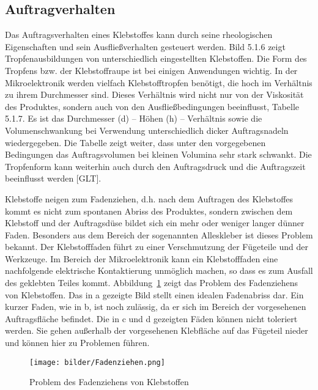 \subsection{Auftragverhalten}
Das Auftragsverhalten eines Klebstoffes kann durch seine rheologischen Eigenschaften und sein Ausfließverhalten gesteuert werden. Bild 5.1.6 zeigt Tropfenausbildungen von unterschiedlich eingestellten Klebstoffen. Die Form des Tropfens bzw. der Klebstoffraupe ist bei einigen Anwendungen wichtig. In der Mikroelektronik werden vielfach Klebstofftropfen benötigt, die hoch im Verhältnis zu ihrem Durchmesser sind. Dieses Verhältnis wird nicht nur von der Viskosität des Produktes, sondern auch von den
Ausfließbedingungen beeinflusst, Tabelle 5.1.7. Es ist das Durchmesser (d) – Höhen (h) – Verhältnis sowie die Volumenschwankung bei Verwendung unterschiedlich dicker Auftragsnadeln wiedergegeben. Die Tabelle zeigt weiter, dass unter den vorgegebenen Bedingungen das Auftragsvolumen bei kleinen Volumina sehr stark schwankt. Die Tropfenform kann weiterhin auch durch den Auftragsdruck und die Auftragszeit beeinflusst werden [GLT].

Klebstoffe neigen zum Fadenziehen, d.h. nach dem Auftragen des Klebstoffes kommt es nicht zum spontanen Abriss des Produktes, sondern zwischen dem Klebstoff und der Auftragsdüse bildet sich ein mehr oder weniger langer dünner Faden. Besonders aus dem Bereich der sogenannten Alleskleber ist dieses Problem bekannt. Der Klebstofffaden führt zu einer Verschmutzung der Fügeteile und der Werkzeuge. Im Bereich der Mikroelektronik kann ein Klebstofffaden eine nachfolgende elektrische Kontaktierung unmöglich machen, so dass es zum Ausfall des geklebten Teiles kommt. Abbildung~\ref{fig:Fadenziehen} zeigt das Problem des Fadenziehens von Klebstoffen. Das in a gezeigte Bild stellt einen idealen Fadenabriss dar. Ein kurzer Faden, wie in b, ist noch zulässig, da er sich im Bereich der vorgesehenen Auftragsfläche befindet. Die in c und d gezeigten Fäden können nicht toleriert werden. Sie gehen außerhalb der vorgesehenen Klebfläche auf das Fügeteil nieder und können hier zu Problemen führen.
\begin{figure}[H]
\begin{center}
\texttt{[image: bilder/Fadenziehen.png]}
\caption{Problem des Fadenziehens von Klebstoffen}
\label{fig:Fadenziehen}
\end{center}
\end{figure}


